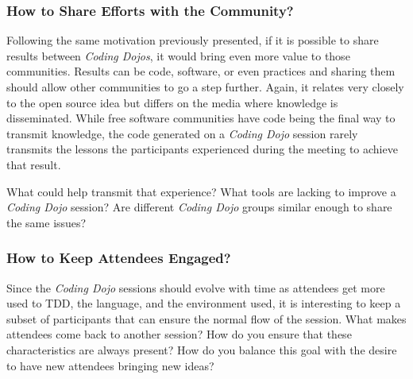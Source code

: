 \subsubsection{How to Share Efforts with the Community?}

Following the same motivation previously presented, if it is possible
to share results between \emph{Coding Dojos}, it would bring even
more value to those communities. Results can be code, software, or
even practices and sharing them should allow other communities to go a
step further. Again, it relates very closely to the open source
idea but differs on the media where knowledge is disseminated. While
free software communities have code being the final way to transmit
knowledge, the code generated on a \emph{Coding Dojo} session rarely
transmits the lessons the participants experienced during the meeting
to achieve that result.

What could help transmit that experience? What tools are lacking to
improve a \emph{Coding Dojo} session? Are different \emph{Coding Dojo}
groups similar enough to share the same issues?

\subsubsection{How to Keep Attendees Engaged?}

Since the \textit{Coding Dojo} sessions should evolve with time as
attendees get more used to TDD, the language, and the environment used,
it is interesting to keep a subset of participants that can ensure the
normal flow of the session. What makes attendees come back to another
session? How do you ensure that these characteristics are always present?
How do you balance this goal with the desire to have new attendees bringing
new ideas?